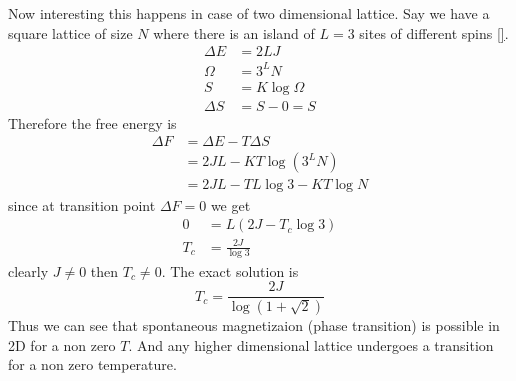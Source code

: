 	
	Now interesting this happens in case of two dimensional lattice. Say we have a square lattice of size $N$ where there is an island of $L=3$ sites of different spins \ref{}.
	\begin{align}
		\Delta E &= 2 L J \\
		\Omega &= 3^L N \\
		S &= K \log \Omega \\
		\Delta S &= S - 0 = S
	\end{align}
	Therefore the free energy is 
	\begin{align}
		\Delta F 
		&= \Delta E - T\Delta S \\
		&= 2JL - KT\log (3^L N) \\
		&= 2 J L - T L \log 3 - K T \log N
	\end{align}
	since at transition point $\Delta F = 0$ we get
	\begin{align}
		0 &= L(2J - T_c \log 3) \\
		T_c &= \frac{2J}{\log 3}
	\end{align}
	clearly $J\neq 0$ then $T_c \neq 0$.
	The exact solution is 
	\begin{equation}
		T_c = \frac{2J}{\log(1 + \sqrt{2})}
	\end{equation}
	Thus we can see that spontaneous magnetizaion (phase transition) is possible in 2D for a non zero $T$. And any higher dimensional lattice undergoes a transition for a non zero temperature.
	
	
